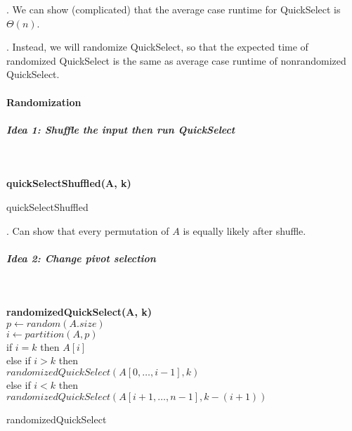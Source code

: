 \documentclass{article}
\begin{document}
\begin{thmm}[].
    We can show (complicated) that the average case runtime for QuickSelect is $\Theta(n)$. 
\end{thmm}

\begin{discovery}[].
    Instead, we will randomize QuickSelect, so that the expected time of randomized QuickSelect is the same as average case runtime of nonrandomized QuickSelect. 
\end{discovery}

\paragraph{Randomization} 

\subparagraph{Idea 1: Shuffle the input then run QuickSelect} 
\phantom{test} \\
\begin{algorithm}[H]
    \SetAlgoLined %
    
    \textbf{quickSelectShuffled(A, k)}\\
    \caption{quickSelectShuffled}
\end{algorithm}

\begin{comm}[].
    Can show that every permutation of $A$ is equally likely after shuffle. 
\end{comm}

\subparagraph{Idea 2: Change pivot selection}
\phantom{text} \\ 
\begin{algorithm}[H]
    \SetAlgoLined %
    
    \textbf{randomizedQuickSelect(A, k)}\\
    $p \leftarrow random(A.size)$ \\ 
    $i \leftarrow partition(A, p)$ \\ 
    if $i = k$ then \Return $A[i]$ \\ 
    else if $i > k$ then \\ 
    \>\> \Return $randomizedQuickSelect(A[0, \ldots, i-1], k)$ \\ 
    else if $i < k$ then \\ 
    \>\> \Return $randomizedQuickSelect(A[i+1, \ldots, n-1], k-(i+1))$ 
    \caption{randomizedQuickSelect}
\end{algorithm}
\end{document}
